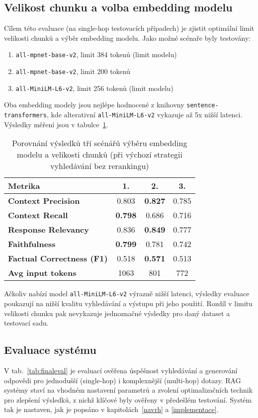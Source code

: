 \subsection{Velikost chunku a volba embedding modelu}
Cílem této evaluace (na single-hop testovacích případech) je zjistit optimální limit velikosti chunků a výběr embedding modelu. Jako možné scénaře byly testovány:
\begin{enumerate}
    \item \texttt{all-mpnet-base-v2}, limit 384 tokenů (limit modelu)
    \item \texttt{all-mpnet-base-v2}, limit 200 tokenů
    \item \texttt{all-MiniLM-L6-v2}, limit 256 tokenů (limit modelu)
\end{enumerate}
Oba embedding modely jsou nejlépe hodnocené z knihovny \texttt{sentence-transformers}, kde alterativní \texttt{all-MiniLM-L6-v2} vykazuje až 5x nižší latenci. Výsledky měření jsou v tabulce~\ref{tab:embedchunk}.

\begin{table}[H]
\centering
\begin{tabular}{lccc}
\toprule
\textbf{Metrika} & \textbf{1.} & \textbf{2.} & \textbf{3.} \\
\midrule
\textbf{Context Precision}         & 0.803 & \textbf{0.827} & 0.785 \\
\textbf{Context Recall}            & \textbf{0.798} & 0.686 & 0.716 \\
\textbf{Response Relevancy}        & 0.836 & \textbf{0.849} & 0.777 \\
\textbf{Faithfulness}              & \textbf{0.799} & 0.781 & 0.742 \\
\textbf{Factual Correctness (F1)}  & 0.518 & \textbf{0.571} & 0.513 \\
\textbf{Avg input tokens}          & 1063 & 801 & 772 \\
\bottomrule
\end{tabular}
\caption{Porovnání výsledků tří scénářů výběru embedding modelu a velikosti chunků (při výchozí strategii vyhledávání bez rerankingu)}
\label{tab:embedchunk}
\end{table}

Ačkoliv nabízí model \texttt{all-MiniLM-L6-v2} výrazně nižší latenci, výsledky evaluace poukazují na nižší kvalitu vyhledávání a výstupu při jeho použití. Rozdíl v limitu velikosti chunku pak nevykazuje jednoznačné výsledky pro daný dataset a testovací sadu.

\subsection{Evaluace systému}
V tab.~\ref{tab:finaleval} je evaluací ověřena úspěšnost vyhledávání a generování odpovědi pro jednodušší (single-hop) i komplexnější (multi-hop) dotazy. RAG systémy staví na vhodném nastavení parametrů a zvolení optimalizačních technik pro zlepšení výsledků, z nichž klíčové byly ověřeny v předešlém testování. Systém tak je nastaven, jak je popsáno v kapitolách~\ref{navrh} a \ref{implementace}.

